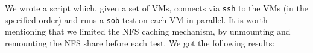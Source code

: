 We wrote a script which, given a set of VMs, connects via \texttt{ssh}
to the VMs (in the specified order) and runs a \texttt{sob} test on
each VM in parallel.
%
It is worth mentioning that we limited the NFS caching mechanism, by
unmounting and remounting the NFS share before each test.
%
We got the following results:


